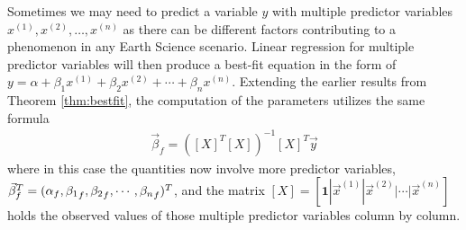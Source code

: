 Sometimes we may need to predict a variable $y$ with multiple predictor variables $x^{(1)}, x^{(2)}, \ldots, x^{(n)}$ as there can be different factors contributing to a phenomenon in any Earth Science scenario. Linear regression for multiple predictor variables will then produce a best-fit equation in the form of $y = \alpha + \beta_1x^{(1)} + \beta_2x^{(2)} + \cdots + \beta_nx^{(n)}$. Extending the earlier results from Theorem \ref{thm:bestfit}, the computation of the parameters utilizes the same formula
\begin{align*}
\vec{\beta}_f = ([X]^T[X])^{-1}[X]^T \vec{y}
\end{align*}
where in this case the quantities now involve more predictor variables, $\smash{\vec{\beta}_f^T} = \smash{(\alpha_f, {\beta_1}_f, {\beta_2}_f, \cdots, {\beta_n}_f)^T}$, and the matrix $[X] = [\textbf{1}|\vec{x}^{(1)}|\vec{x}^{(2)}|\cdots|\vec{x}^{(n)}]$ holds the observed values of those multiple predictor variables column by column.

